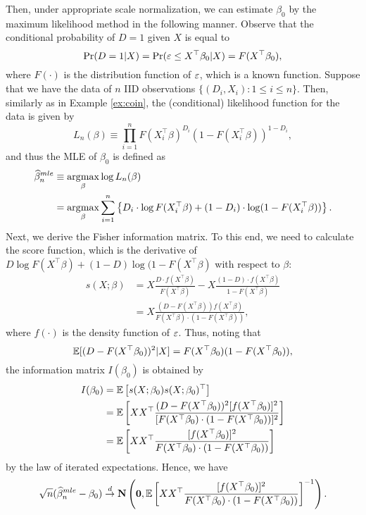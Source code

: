 \documentclass[11pt, A4paper, openany, uplatex]{book}
\begin{document}
Then, under appropriate scale normalization, we can estimate $\beta_0$ by the maximum likelihood method in the following manner.
Observe that the conditional probability of $D = 1$ given $X$ is equal to
\[
	\Pr(D = 1 | X) = \Pr( \varepsilon \le X^\top\beta_0 | X) = F(X^\top\beta_0),
\]
where $F(\cdot)$ is the distribution function of $\varepsilon$, which is a known function.
Suppose that we have the data of $n$ IID observations $\{(D_i, X_i): 1 \le i \le n\}$.
Then, similarly as in Example \ref{ex:coin}, the (conditional) likelihood function for the data is given by
\[
	L_n(\beta) \equiv \prod_{i=1}^n F(X_i^\top\beta)^{D_i} (1 -  F(X_i^\top\beta))^{1 - D_i},
\] 
and thus the MLE of $\beta_0$ is defined as
\begin{align*}
	\widehat \beta_n^{mle} 
	& \equiv \operatorname*{\arg\!\max}_\beta \log L_n(\beta) \\
	& = \operatorname*{\arg\!\max}_\beta \sum_{i =1}^n\left\{ D_i \cdot \log F(X_i^\top \beta) + (1 - D_i) \cdot \log(1 -  F(X_i^\top\beta)) \right\}.
\end{align*}
Next, we derive the Fisher information matrix.
To this end, we need to calculate the score function, which is the derivative of  $D \log F(X^\top \beta) + (1 - D) \log(1 -  F(X^\top\beta)$ with respect to $\beta$:
\begin{align*}
	s(X; \beta) 
	& = X \frac{D \cdot f(X^\top \beta)}{F(X^\top \beta)} - X \frac{(1 - D) \cdot f(X^\top \beta)}{1 - F(X^\top \beta)}\\
	& = X \frac{(D - F(X^\top \beta))f(X^\top \beta)}{F(X^\top \beta) \cdot (1 -  F(X^\top\beta)) },
\end{align*}
where $f(\cdot)$ is the density function of $\varepsilon$.
Thus, noting that 
\[
	\mathbb{E}[(D - F(X^\top\beta_0))^2|X] = F(X^\top \beta_0) (1 - F(X^\top \beta_0)),
\]
the information matrix $I(\beta_0)$ is obtained by
\begin{align*}
	I(\beta_0)
	& = \mathbb{E}\left[ s(X; \beta_0) s(X; \beta_0)^\top \right] \\ 
	& = \mathbb{E}\left[ XX^\top  \frac{(D - F(X^\top \beta_0))^2 [f(X^\top \beta_0)]^2}{[F(X^\top \beta_0) \cdot (1 -  F(X^\top\beta_0))]^2 }\right] \\
	& = \mathbb{E}\left[ XX^\top  \frac{[f(X^\top \beta_0)]^2}{F(X^\top \beta_0) \cdot (1 -  F(X^\top\beta_0)) }\right] 
\end{align*}
by the law of iterated expectations.
Hence, we have
\[
	\sqrt{n}(\widehat \beta_n^{mle} - \beta_0) \overset{d}{\to} \mathbf{N}\left( \mathbf{0}, \mathbb{E}\left[ XX^\top  \frac{[f(X^\top \beta_0)]^2}{F(X^\top \beta_0) \cdot (1 -  F(X^\top\beta_0)) }\right]^{-1}  \right).
\]
\end{document}
